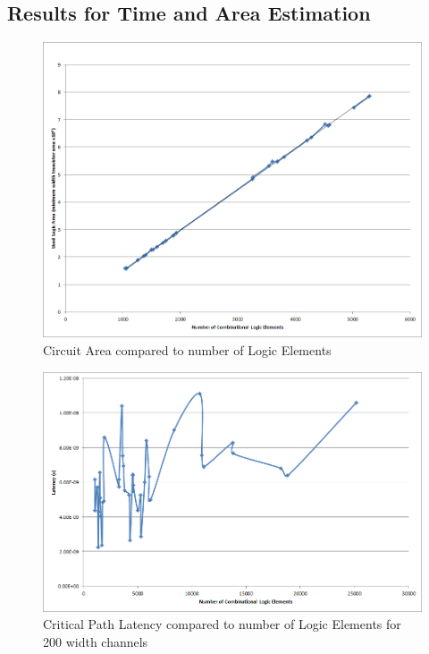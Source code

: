 \documentclass[12pt,drafta4paper,oneside]{memoir} %
\begin{document}
\subsection{Results for Time and Area Estimation}
\begin{figure}
    \includegraphics[width=\textwidth]{images/area-v-elements.png}
    \caption{Circuit Area compared to number of Logic Elements}
    \label{AreaVElements}
\end{figure}
\begin{figure}
    \includegraphics[width=\textwidth]{images/InputsVTiming200.png}
    \caption{Critical Path Latency compared to number of Logic Elements for 200 width channels}
    \label{AreaVElements}
\end{figure}
\end{document}

